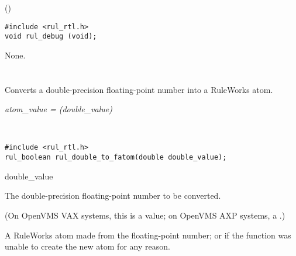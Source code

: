 \Syntax

()

\CBinding
\begin{verbatim}
#include <rul_rtl.h>
void rul_debug (void);
\end{verbatim}

\Arguments

None.

\section*{}

Converts a double-precision floating-point number into a RuleWorks
 atom.

\Syntax

\it{atom\_value} = (\it{double\_value})

\begin{args}
   \\
\end{args}

\CBinding
\begin{verbatim}
#include <rul_rtl.h>
rul_boolean rul_double_to_fatom(double double_value);
\end{verbatim}

\begin{argument}
\item[double\_value]

  The double-precision floating-point number to be converted.
    
  (On OpenVMS VAX systems, this is a  value; on OpenVMS
  AXP systems, a .)
\end{argument}

\ReturnValue

A RuleWorks atom made from the floating-point number; or
 if the function was unable to create the
new atom for any reason.

\begin{seealso}

\end{seealso}

\section*{}

